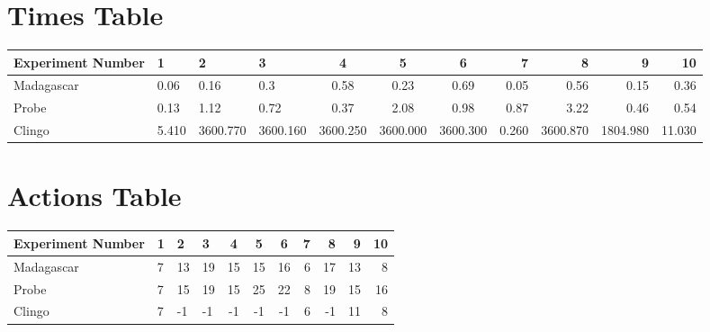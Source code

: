 \documentclass[8pt]{article}
\begin{document}
\begin{landscape}
\section{Times Table}\begin{tabular}{ | l | l | l | l | c | c | c | r | r | r | r | }\hline
Experiment Number & 1 & 2 & 3 & 4 & 5 & 6 & 7 & 8 & 9 & 10\\  \hline
Madagascar & 0.06 & 0.16 & 0.3 & 0.58 & 0.23 & 0.69 & 0.05 & 0.56 & 0.15 & 0.36\\  \hline
Probe & 0.13 & 1.12 & 0.72 & 0.37 & 2.08 & 0.98 & 0.87 & 3.22 & 0.46 & 0.54\\  \hline
Clingo & 5.410 & 3600.770 & 3600.160 & 3600.250 & 3600.000 & 3600.300 & 0.260 & 3600.870 & 1804.980 & 11.030\\  \hline
\end{tabular}
\section{Actions Table}\begin{tabular}{ | l | l | l | l | c | c | c | r | r | r | r | }\hline
Experiment Number & 1 & 2 & 3 & 4 & 5 & 6 & 7 & 8 & 9 & 10\\ \hline
 Madagascar & 7 & 13 & 19 & 15 & 15 & 16 & 6 & 17 & 13 & 8\\ \hline
 Probe & 7 & 15 & 19 & 15 & 25 & 22 & 8 & 19 & 15 & 16\\ \hline
 Clingo & 7 & -1 & -1 & -1 & -1 & -1 & 6 & -1 & 11 & 8\\ \hline
\end{tabular}
\end{landscape}
\end{document}
